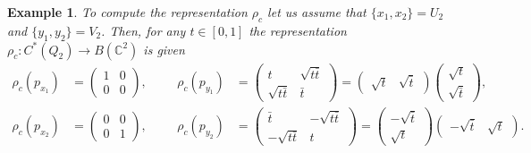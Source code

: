 \documentclass[a4paper]{amsart}
\newcommand{\C}{\mathbb{C}}
\newtheorem{example}[thm]{Example}
\begin{document}
\begin{example}
    To compute the representation $\rho_c$ let us assume that $\{x_1, x_2\} = U_2$ and $\{y_1, y_2\} = V_2$. Then, for any $t \in [0,1]$ the representation $\rho_c: C^\ast(Q_2) \to B(\C^2)$ is given
    \begin{align*}
        \rho_c(p_{x_1}) &= \begin{pmatrix}
            1 & 0 \\
            0 & 0
        \end{pmatrix}, & &&
        \rho_c(p_{y_1}) &= \begin{pmatrix}
            t & \sqrt{t \bar{t}} \\
            \sqrt{t \bar{t}} & \bar{t}
        \end{pmatrix} =
        \begin{pmatrix}
            \sqrt{t} & \sqrt{\bar{t}}
        \end{pmatrix}
        \begin{pmatrix}
            \sqrt{t} \\
            \sqrt{\bar{t}}
        \end{pmatrix}, \\
        \rho_c(p_{x_2}) &= \begin{pmatrix}
            0 & 0 \\
            0 & 1
        \end{pmatrix}, & &&
        \rho_c(p_{y_2}) &= \begin{pmatrix}
            \bar{t} & -\sqrt{t \bar{t}} \\
            -\sqrt{t \bar{t}} & t
        \end{pmatrix} =
        \begin{pmatrix}
            -\sqrt{\bar{t}} \\
            \sqrt{t}
        \end{pmatrix}
        \begin{pmatrix}
            -\sqrt{\bar{t}} &  \sqrt{t}
        \end{pmatrix}.
    \end{align*}
\end{example}
\end{document}
